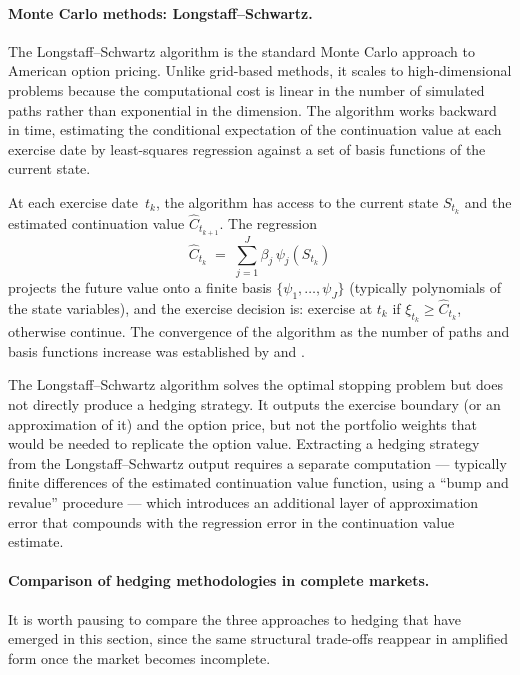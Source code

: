 \paragraph{Monte Carlo methods: Longstaff--Schwartz.}
The Longstaff--Schwartz algorithm \citep{LongstaffSchwartz2001} is the
standard Monte Carlo approach to American option pricing.  Unlike
grid-based methods, it scales to high-dimensional problems because the
computational cost is linear in the number of simulated paths rather than
exponential in the dimension.  The algorithm works backward in time,
estimating the conditional expectation of the continuation value at each
exercise date by least-squares regression against a set of basis functions
of the current state.

At each exercise date~$t_k$, the algorithm has access to the current
state $S_{t_k}$ and the estimated continuation value
$\hat{C}_{t_{k+1}}$.  The regression
\begin{equation}
\label{eq:LS_regression}
\hat{C}_{t_k}
\;=\; \sum_{j=1}^{J} \beta_j \, \psi_j(S_{t_k})
\end{equation}
projects the future value onto a finite basis
$\{\psi_1, \ldots, \psi_J\}$ (typically polynomials of the state
variables), and the exercise decision is: exercise at $t_k$ if
$\xi_{t_k} \ge \hat{C}_{t_k}$, otherwise continue.  The convergence of
the algorithm as the number of paths and basis functions increase was
established by \citet{TsitsiklisVanRoy2001} and
\citet{ClementLamberton2002}.

The Longstaff--Schwartz algorithm solves the optimal stopping problem but
does not directly produce a hedging strategy.  It outputs the exercise
boundary (or an approximation of it) and the option price, but not the
portfolio weights that would be needed to replicate the option value.
Extracting a hedging strategy from the Longstaff--Schwartz output
requires a separate computation --- typically finite differences of the
estimated continuation value function, using a ``bump and revalue''
procedure --- which introduces an additional layer of approximation
error that compounds with the regression error in the continuation value
estimate.

\paragraph{Comparison of hedging methodologies in complete markets.}
It is worth pausing to compare the three approaches to hedging that have
emerged in this section, since the same structural trade-offs reappear in
amplified form once the market becomes incomplete.

